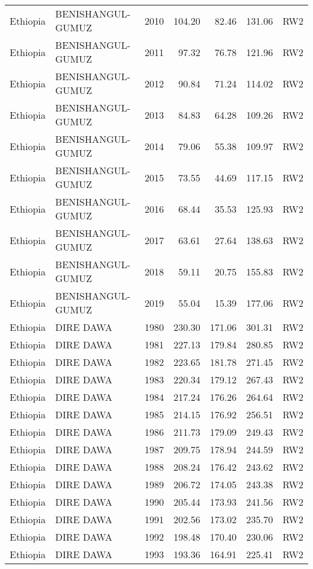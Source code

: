 \begin{longtable}{lllrrrl}
  Ethiopia & BENISHANGUL-GUMUZ & 2010 & 104.20 & 82.46 & 131.06 & RW2 \\ 
  Ethiopia & BENISHANGUL-GUMUZ & 2011 & 97.32 & 76.78 & 121.96 & RW2 \\ 
  Ethiopia & BENISHANGUL-GUMUZ & 2012 & 90.84 & 71.24 & 114.02 & RW2 \\ 
  Ethiopia & BENISHANGUL-GUMUZ & 2013 & 84.83 & 64.28 & 109.26 & RW2 \\ 
  Ethiopia & BENISHANGUL-GUMUZ & 2014 & 79.06 & 55.38 & 109.97 & RW2 \\ 
  Ethiopia & BENISHANGUL-GUMUZ & 2015 & 73.55 & 44.69 & 117.15 & RW2 \\ 
  Ethiopia & BENISHANGUL-GUMUZ & 2016 & 68.44 & 35.53 & 125.93 & RW2 \\ 
  Ethiopia & BENISHANGUL-GUMUZ & 2017 & 63.61 & 27.64 & 138.63 & RW2 \\ 
  Ethiopia & BENISHANGUL-GUMUZ & 2018 & 59.11 & 20.75 & 155.83 & RW2 \\ 
  Ethiopia & BENISHANGUL-GUMUZ & 2019 & 55.04 & 15.39 & 177.06 & RW2 \\ 
  Ethiopia & DIRE DAWA & 1980 & 230.30 & 171.06 & 301.31 & RW2 \\ 
  Ethiopia & DIRE DAWA & 1981 & 227.13 & 179.84 & 280.85 & RW2 \\ 
  Ethiopia & DIRE DAWA & 1982 & 223.65 & 181.78 & 271.45 & RW2 \\ 
  Ethiopia & DIRE DAWA & 1983 & 220.34 & 179.12 & 267.43 & RW2 \\ 
  Ethiopia & DIRE DAWA & 1984 & 217.24 & 176.26 & 264.64 & RW2 \\ 
  Ethiopia & DIRE DAWA & 1985 & 214.15 & 176.92 & 256.51 & RW2 \\ 
  Ethiopia & DIRE DAWA & 1986 & 211.73 & 179.09 & 249.43 & RW2 \\ 
  Ethiopia & DIRE DAWA & 1987 & 209.75 & 178.94 & 244.59 & RW2 \\ 
  Ethiopia & DIRE DAWA & 1988 & 208.24 & 176.42 & 243.62 & RW2 \\ 
  Ethiopia & DIRE DAWA & 1989 & 206.72 & 174.05 & 243.38 & RW2 \\ 
  Ethiopia & DIRE DAWA & 1990 & 205.44 & 173.93 & 241.56 & RW2 \\ 
  Ethiopia & DIRE DAWA & 1991 & 202.56 & 173.02 & 235.70 & RW2 \\ 
  Ethiopia & DIRE DAWA & 1992 & 198.48 & 170.40 & 230.06 & RW2 \\ 
  Ethiopia & DIRE DAWA & 1993 & 193.36 & 164.91 & 225.41 & RW2 \\ 

\end{longtable}
